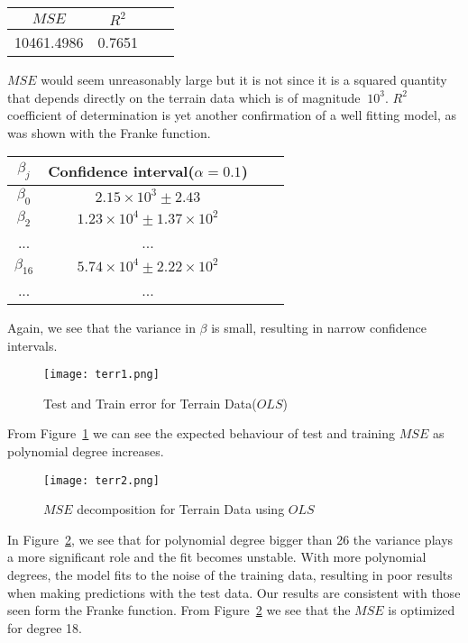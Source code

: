 \documentclass{emulateapj}
\begin{document}
\begin{center}
\begin{tabular}{ |c|c|c|c| } 
\hline
$MSE$ & $R^2$ \\
\hline
10461.4986 & 0.7651 \\ 
\hline
\end{tabular}
\end{center}
$MSE$ would seem unreasonably large but it is not since it is a squared quantity that depends directly on the terrain data which is of magnitude $~10^{3}$. 
$R^2$ coefficient of determination is yet another confirmation of a well fitting model, as was shown with the Franke function. 
\begin{center}
\begin{tabular}{ |c|c|c|c| } 
\hline
$\beta_j$ & Confidence interval($\alpha=0.1$) \\
\hline
$\beta_0$ & $2.15\times10^3\pm2.43$\\
$\beta_2$ & $1.23\times10^4\pm1.37\times10^2$\\
... & ...\\
$\beta_{16}$ & $5.74\times10^4\pm2.22\times10^2$\\
... & ...\\
\hline
\end{tabular}
\end{center}
Again, we see that the variance in $\beta$ is small, resulting in narrow confidence intervals.
\begin{figure}[H]
    \centering
    \texttt{[image: terr1.png]}
    \caption{Test and Train error for Terrain Data($OLS$)}
    \label{ma}
\end{figure}
From Figure~\ref{ma} we can see the expected behaviour of test and training $MSE$ as polynomial degree increases.
\begin{figure}[H]
    \centering
    \texttt{[image: terr2.png]}
    \caption{$MSE$ decomposition for Terrain Data using $OLS$}
    \label{OLS_1}
\end{figure}

 In Figure~\ref{OLS_1}, we see that for polynomial degree bigger than 26 the variance plays a more significant role and  the fit becomes unstable. With more polynomial degrees, the model fits to the noise of the training data, resulting in poor results when making predictions with the test data. Our results are consistent with those seen form the Franke function. From Figure~\ref{OLS_1} we see that the $MSE$ is optimized for degree 18.
 
\end{document}
